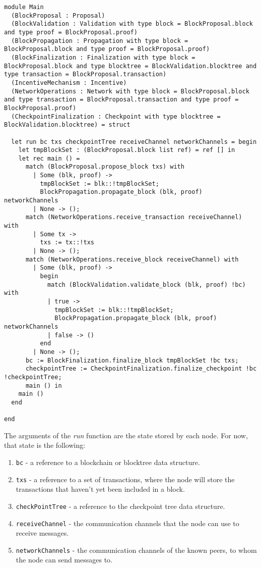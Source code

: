 \begin{lstlisting}
module Main
  (BlockProposal : Proposal)
  (BlockValidation : Validation with type block = BlockProposal.block and type proof = BlockProposal.proof)
  (BlockPropagation : Propagation with type block = BlockProposal.block and type proof = BlockProposal.proof)
  (BlockFinalization : Finalization with type block = BlockProposal.block and type blocktree = BlockValidation.blocktree and type transaction = BlockProposal.transaction)
  (IncentiveMechanism : Incentive)
  (NetworkOperations : Network with type block = BlockProposal.block and type transaction = BlockProposal.transaction and type proof = BlockProposal.proof)
  (CheckpointFinalization : Checkpoint with type blocktree = BlockValidation.blocktree) = struct

  let run bc txs checkpointTree receiveChannel networkChannels = begin
    let tmpBlockSet : (BlockProposal.block list ref) = ref [] in
    let rec main () =
      match (BlockProposal.propose_block txs) with
        | Some (blk, proof) ->
          tmpBlockSet := blk::!tmpBlockSet;
          BlockPropagation.propagate_block (blk, proof) networkChannels
        | None -> ();
      match (NetworkOperations.receive_transaction receiveChannel) with
        | Some tx ->
          txs := tx::!txs
        | None -> ();
      match (NetworkOperations.receive_block receiveChannel) with
        | Some (blk, proof) ->
          begin
            match (BlockValidation.validate_block (blk, proof) !bc) with
            | true ->
              tmpBlockSet := blk::!tmpBlockSet;
              BlockPropagation.propagate_block (blk, proof) networkChannels
            | false -> ()
          end
        | None -> ();
      bc := BlockFinalization.finalize_block tmpBlockSet !bc txs;
      checkpointTree := CheckpointFinalization.finalize_checkpoint !bc !checkpointTree;
      main () in
    main ()
  end

end
\end{lstlisting}

The arguments of the \textit{run} function are the state stored by each node. For now, that state is the following:

\begin{enumerate}
  \item \texttt{bc} - a reference to a blockchain or blocktree data structure.
  \item \texttt{txs} - a reference to a set of transactions, where the node will store the transactions that haven't yet been included in a block.
  \item \texttt{checkPointTree} - a reference to the checkpoint tree data structure.
  \item \texttt{receiveChannel} - the communication channels that the node can use to receive messages.
  \item \texttt{networkChannels} - the communication channels of the known peers, to whom the node can send messages to.
\end{enumerate}

